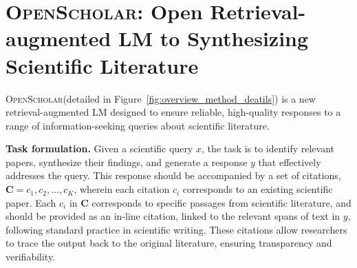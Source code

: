 \documentclass{article} %
\newcommand{\model}{\textsc{OpenScholar}\xspace}
\renewcommand{\paragraph}[1]{\noindent \textbf{#1}}
\newcommand{\Fref}[1]{Figure~\ref{#1}}
\begin{document}



\section{\model: Open Retrieval-augmented LM to Synthesizing Scientific Literature}

\label{sec:model}

\model (detailed in \Fref{fig:overview_method_deatils}) is a new retrieval-augmented LM designed to ensure reliable, high-quality responses to a range of information-seeking queries about scientific literature. 

\paragraph{Task formulation. }
Given a scientific query $x$, the task is to identify relevant papers, synthesize their findings, and generate a response $y$ that effectively addresses the query. This response should be accompanied by a set of citations, $\mathbf{C} = {c_1, c_2, \ldots, c_K}$, wherein each citation $c_i$ corresponds to an existing scientific paper. Each $c_i$ in $\mathbf{C}$ corresponds to specific passages from scientific literature, and should be provided as an in-line citation, linked to the relevant spans of text in $y$, following standard practice in scientific writing.
These citations allow researchers to trace the output back to the original literature, ensuring transparency and verifiability. 
\end{document}
